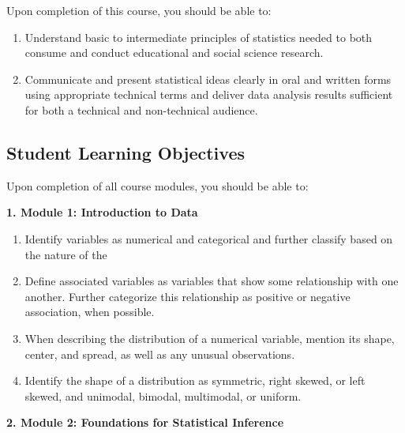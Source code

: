\documentclass[
]{article}
\providecommand{\tightlist}{%
  \setlength{\itemsep}{0pt}\setlength{\parskip}{0pt}}
\begin{document}
Upon completion of this course, you should be able to:

\begin{enumerate}
\def\labelenumi{\arabic{enumi}.}
\tightlist
\item
  Understand basic to intermediate principles of statistics needed to
  both consume and conduct educational and social science research.
\item
  Communicate and present statistical ideas clearly in oral and written
  forms using appropriate technical terms and deliver data analysis
  results sufficient for both a technical and non-technical audience.
\end{enumerate}

\subsection{Student Learning Objectives}

Upon completion of all course modules, you should be able to:

\textbf{1. Module 1: Introduction to Data}

\begin{enumerate}
\def\labelenumi{\arabic{enumi}.}
\tightlist
\item
  Identify variables as numerical and categorical and further classify
  based on the nature of the
\item
  Define associated variables as variables that show some relationship
  with one another. Further categorize this relationship as positive or
  negative association, when possible.
\item
  When describing the distribution of a numerical variable, mention its
  shape, center, and spread, as well as any unusual observations.
\item
  Identify the shape of a distribution as symmetric, right skewed, or
  left skewed, and unimodal, bimodal, multimodal, or uniform.
\end{enumerate}

\vspace{.25cm}

\textbf{2. Module 2: Foundations for Statistical Inference}
\end{document}

